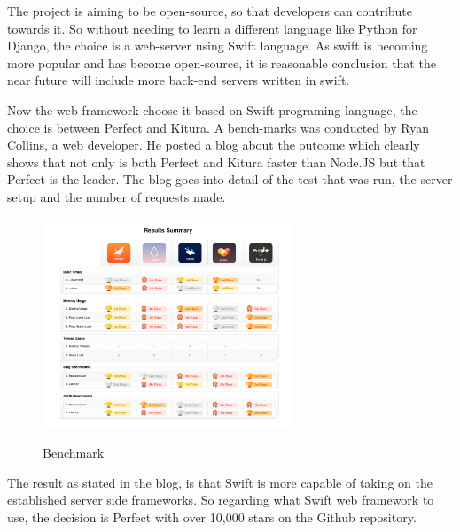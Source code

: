 The project is aiming to be open-source, so that developers can contribute towards it. So without needing to learn a different language like Python for Django, the choice is a web-server using Swift language. As swift is becoming more popular and has become open-source, it is reasonable conclusion that the near future will include more back-end servers written in swift.

Now the web framework choose it based on Swift programing language, the choice is between Perfect and Kitura. A bench-marks was conducted by Ryan Collins, a web developer. He posted a blog about the outcome \cite{benchmark} which clearly shows that not only is both Perfect and Kitura faster than Node.JS but that Perfect is the leader. The blog goes into detail of the test that was run, the server setup and the number of requests made.

\begin{figure}[!h]
    \caption{Benchmark}
    \centering
    \includegraphics[width=75mm]{images/benchmarks}
    \label{fig:label}
\end{figure}

The result as stated in the blog, is that Swift is more capable of taking on the established server side frameworks. So regarding what Swift web framework to use, the decision is Perfect with over 10,000 stars on the Github repository. \cite{github1} 

